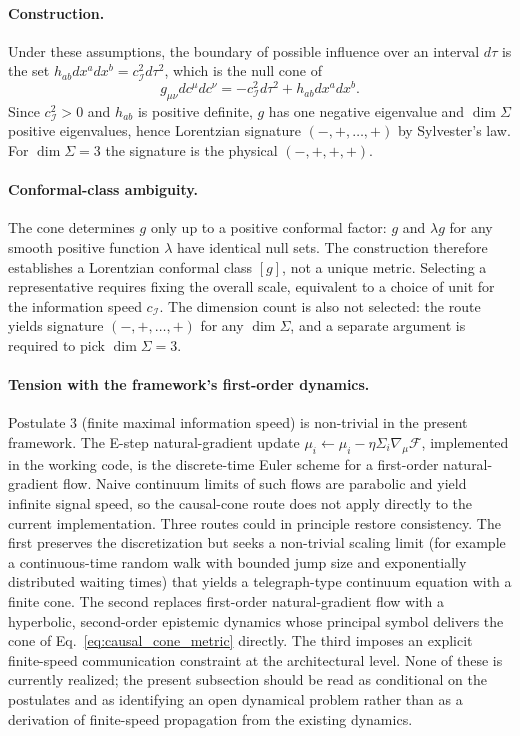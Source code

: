 \documentclass[11pt]{article}
\begin{document}
\paragraph{Construction.}
Under these assumptions, the boundary of possible influence over an interval $d\tau$ is the set $h_{ab} dx^a dx^b = c_\mathcal{I}^2 d\tau^2$, which is the null cone of
\begin{equation}
g_{\mu\nu} dc^\mu dc^\nu = -c_\mathcal{I}^2 d\tau^2 + h_{ab} dx^a dx^b.
\label{eq:causal_cone_metric}
\end{equation}
Since $c_\mathcal{I}^2 > 0$ and $h_{ab}$ is positive definite, $g$ has one negative eigenvalue and $\dim\Sigma$ positive eigenvalues, hence Lorentzian signature $(-,+,\ldots,+)$ by Sylvester's law. For $\dim\Sigma = 3$ the signature is the physical $(-,+,+,+)$.

\paragraph{Conformal-class ambiguity.}
The cone determines $g$ only up to a positive conformal factor: $g$ and $\lambda g$ for any smooth positive function $\lambda$ have identical null sets. The construction therefore establishes a Lorentzian conformal class $[g]$, not a unique metric. Selecting a representative requires fixing the overall scale, equivalent to a choice of unit for the information speed $c_\mathcal{I}$. The dimension count is also not selected: the route yields signature $(-,+,\ldots,+)$ for any $\dim\Sigma$, and a separate argument is required to pick $\dim\Sigma = 3$.

\paragraph{Tension with the framework's first-order dynamics.}
Postulate 3 (finite maximal information speed) is non-trivial in the present framework. The E-step natural-gradient update $\mu_i \leftarrow \mu_i - \eta \Sigma_i \nabla_\mu\mathcal{F}$, implemented in the working code, is the discrete-time Euler scheme for a first-order natural-gradient flow. Naive continuum limits of such flows are parabolic and yield infinite signal speed, so the causal-cone route does not apply directly to the current implementation. Three routes could in principle restore consistency. The first preserves the discretization but seeks a non-trivial scaling limit (for example a continuous-time random walk with bounded jump size and exponentially distributed waiting times) that yields a telegraph-type continuum equation with a finite cone. The second replaces first-order natural-gradient flow with a hyperbolic, second-order epistemic dynamics whose principal symbol delivers the cone of Eq.~\eqref{eq:causal_cone_metric} directly. The third imposes an explicit finite-speed communication constraint at the architectural level. None of these is currently realized; the present subsection should be read as conditional on the postulates and as identifying an open dynamical problem rather than as a derivation of finite-speed propagation from the existing dynamics.
\end{document}
